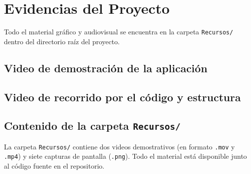 \documentclass[12pt,a4paper]{article}
\begin{document}
\section{Evidencias del Proyecto}

Todo el material gráfico y audiovisual se encuentra en la carpeta
\texttt{Recursos/} dentro del directorio raíz del proyecto.

\subsection{Video de demostración de la aplicación}

\begin{figure}[H]
    \centering
    \href{../Recursos/demo.mov}{}
    \label{fig:demo}
\end{figure}

\subsection{Video de recorrido por el código y estructura}

\begin{figure}[H]
    \centering
    \href{../Recursos/demo-codigo-y-estructura.mov}{}
    \label{fig:codigo-video}
\end{figure}

\subsection{Contenido de la carpeta \texttt{Recursos/}}

La carpeta \texttt{Recursos/} contiene dos videos demostrativos (en
formato \texttt{.mov} y \texttt{.mp4}) y siete capturas de pantalla
(\texttt{.png}). Todo el material está disponible junto al código fuente
en el repositorio.
\end{document}
